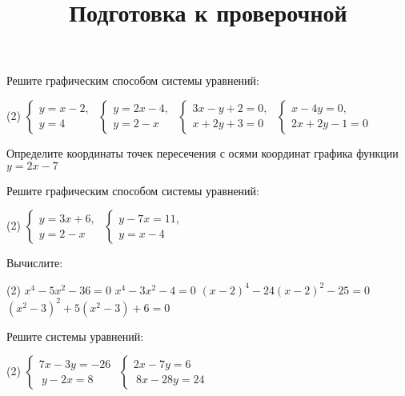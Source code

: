 \begin{class}[number=7]
	\title{Подготовка к проверочной}
	\begin{listofex}
		\item Решите графическим способом системы уравнений:
		\begin{tasks}(2)
			\task \( \begin{cases} y=x-2,\\y=4 \end{cases} \)
			\task \( \begin{cases} y=2x-4,\\y=2-x \end{cases} \)
			\task \( \begin{cases} 3x-y+2=0,\\x+2y+3=0 \end{cases} \)
			\task \( \begin{cases} x-4y=0,\\2x+2y-1=0 \end{cases} \)
		\end{tasks}
		\item Определите координаты точек пересечения с осями координат графика функции \( y=2x-7 \)
		\item Решите графическим способом системы уравнений:
		\begin{tasks}(2)
			\task \( \begin{cases} y=3x+6,\\y=2-x \end{cases} \)
			\task \( \begin{cases} y-7x=11,\\y=x-4 \end{cases} \)
		\end{tasks}
		\item Вычислите:
		\begin{tasks}(2)
			\task \( x^{4} - 5x^{2} - 36 = 0 \)
			\task \( x^{4} - 3x^{2} - 4 = 0 \)
			\task \( (x-2)^{4}-24(x-2)^{2}-25=0 \)
			\task \( (x^{2}-3)^{2}+5(x^{2}-3)+6=0 \)
		\end{tasks}
		\item  Решите системы уравнений:
		\begin{tasks}(2)
			\task \( \begin{cases}
				7x-3y=-26 \\\
				 y-2x=8
			\end{cases} \)
			\task \( \begin{cases}
				2x-7y=6 \\\
				 8x-28y=24
			\end{cases} \)
		\end{tasks}
	\end{listofex}
\end{class}

